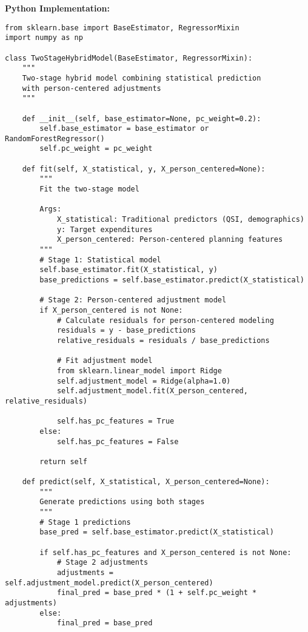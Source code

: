 \textbf{Python Implementation:}
\begin{lstlisting}
from sklearn.base import BaseEstimator, RegressorMixin
import numpy as np

class TwoStageHybridModel(BaseEstimator, RegressorMixin):
    """
    Two-stage hybrid model combining statistical prediction 
    with person-centered adjustments
    """
    
    def __init__(self, base_estimator=None, pc_weight=0.2):
        self.base_estimator = base_estimator or RandomForestRegressor()
        self.pc_weight = pc_weight
        
    def fit(self, X_statistical, y, X_person_centered=None):
        """
        Fit the two-stage model
        
        Args:
            X_statistical: Traditional predictors (QSI, demographics)
            y: Target expenditures
            X_person_centered: Person-centered planning features
        """
        # Stage 1: Statistical model
        self.base_estimator.fit(X_statistical, y)
        base_predictions = self.base_estimator.predict(X_statistical)
        
        # Stage 2: Person-centered adjustment model
        if X_person_centered is not None:
            # Calculate residuals for person-centered modeling
            residuals = y - base_predictions
            relative_residuals = residuals / base_predictions
            
            # Fit adjustment model
            from sklearn.linear_model import Ridge
            self.adjustment_model = Ridge(alpha=1.0)
            self.adjustment_model.fit(X_person_centered, relative_residuals)
            
            self.has_pc_features = True
        else:
            self.has_pc_features = False
            
        return self
    
    def predict(self, X_statistical, X_person_centered=None):
        """
        Generate predictions using both stages
        """
        # Stage 1 predictions
        base_pred = self.base_estimator.predict(X_statistical)
        
        if self.has_pc_features and X_person_centered is not None:
            # Stage 2 adjustments
            adjustments = self.adjustment_model.predict(X_person_centered)
            final_pred = base_pred * (1 + self.pc_weight * adjustments)
        else:
            final_pred = base_pred
            

\end{lstlisting}
